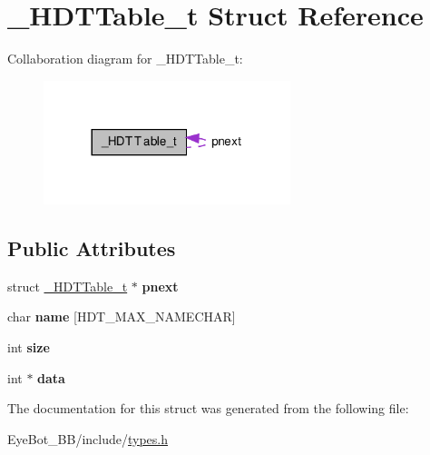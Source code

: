 \hypertarget{struct___h_d_t_table__t}{\section{\-\_\-\-H\-D\-T\-Table\-\_\-t \-Struct \-Reference}
\label{struct___h_d_t_table__t}
}


\-Collaboration diagram for \-\_\-\-H\-D\-T\-Table\-\_\-t\-:\nopagebreak
\begin{figure}[H]
\begin{center}
\leavevmode
\includegraphics[width=204pt]{struct___h_d_t_table__t__coll__graph}
\end{center}
\end{figure}
\subsection*{\-Public \-Attributes}
\begin{DoxyCompactItemize}
\item 
\hypertarget{struct___h_d_t_table__t_a088a69d16ad154132d9e9d86020c28af}{struct \hyperlink{struct___h_d_t_table__t}{\-\_\-\-H\-D\-T\-Table\-\_\-t} $\ast$ {\bfseries pnext}}\label{struct___h_d_t_table__t_a088a69d16ad154132d9e9d86020c28af}

\item 
\hypertarget{struct___h_d_t_table__t_a357b71a7d12c07cfffb215a6d5430e44}{char {\bfseries name} \mbox{[}\-H\-D\-T\-\_\-\-M\-A\-X\-\_\-\-N\-A\-M\-E\-C\-H\-A\-R\mbox{]}}\label{struct___h_d_t_table__t_a357b71a7d12c07cfffb215a6d5430e44}

\item 
\hypertarget{struct___h_d_t_table__t_a31fea7d05b38bcdac616e906be2be055}{int {\bfseries size}}\label{struct___h_d_t_table__t_a31fea7d05b38bcdac616e906be2be055}

\item 
\hypertarget{struct___h_d_t_table__t_a5f5a2d6c339cc325cd8791f59902ea11}{int $\ast$ {\bfseries data}}\label{struct___h_d_t_table__t_a5f5a2d6c339cc325cd8791f59902ea11}

\end{DoxyCompactItemize}


\-The documentation for this struct was generated from the following file\-:\begin{DoxyCompactItemize}
\item 
\-Eye\-Bot\-\_\-\-B\-B/include/\hyperlink{types_8h}{types.\-h}\end{DoxyCompactItemize}
